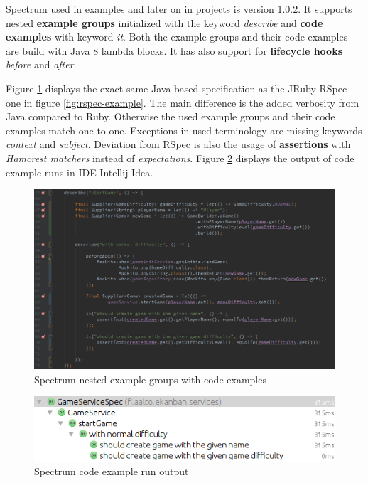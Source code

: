     Spectrum used in examples and later on in projects is version 1.0.2. It supports nested \textbf{example groups} initialized
    with the keyword \textit{describe} and \textbf{code examples} with keyword \textit{it}. Both the example groups and their code
    examples are build with Java 8 lambda blocks. It has also support for \textbf{lifecycle hooks} \textit{before} and \textit{after}. ~\cite{spectrum-102}

    Figure \ref{fig:spectrum-example} displays the exact same Java-based specification as the JRuby RSpec one in figure \ref{fig:rspec-example}.
    The main difference is the added verbosity from Java compared to Ruby. Otherwise the used example groups and their code examples
    match one to one. Exceptions in used terminology are missing keywords \textit{context} and \textit{subject}.
    Deviation from RSpec is also the usage of \textbf{assertions} with \textit{Hamcrest matchers} instead of \textit{expectations}.
    Figure \ref{fig:spectrum-result}
    displays the output of code example runs in IDE Intellij Idea.
    \begin{figure}[ht]
      \begin{center}
        \includegraphics[width=13.7cm]{images/spectrum-example.png}
        \caption{Spectrum nested example groups with code examples}
        \label{fig:spectrum-example}
      \end{center}
    \end{figure}
    \begin{figure}[ht]
      \begin{center}
        \includegraphics[width=13.7cm]{images/spectrum-result.png}
        \caption{Spectrum code example run output}
        \label{fig:spectrum-result}
      \end{center}
    \end{figure}


